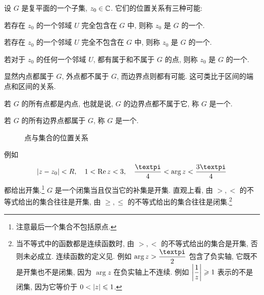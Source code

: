 设 $G$ 是复平面的一个子集, $z_0\in{\mathbb{C}}$.
它们的位置关系有三种可能:
\begin{enuma}
  \item 若存在 $z_0$ 的一个邻域 $U$ 完全包含在 $G$ 中, 则称 $z_0$ 是 $G$ 的一个.
  \item 若存在 $z_0$ 的一个邻域 $U$ 完全不包含在 $G$ 中, 则称 $z_0$ 是 $G$ 的一个.
  \item 若对于 $z_0$ 的任何一个邻域 $U$, 都有属于和不属于 $G$ 的点, 则称 $z_0$ 是 $G$ 的一个.
\end{enuma}

显然内点都属于 $G$, 外点都不属于 $G$, 而边界点则都有可能.
这可类比于区间的端点和区间的关系.

\begin{definition}
  \begin{enuma}
    \item 若 $G$ 的所有点都是内点, 也就是说, $G$ 的边界点都不属于它, 称 $G$ 是一个.
    \item 若 $G$ 的所有边界点都属于 $G$, 称 $G$ 是一个.
  \end{enuma}
\end{definition}

\begin{figure}[H]
  \centering
  \caption{点与集合的位置关系}
\end{figure}

例如
\[
  \abs{z-z_0}<R,\quad 1<\Re z<3,\quad\frac\cpi4<\arg z<\frac{3\cpi}4
\]
都给出开集.\footnote{
  注意最后一个集合不包括原点.
}
$G$ 是一个闭集当且仅当它的补集是开集.
直观上看, 由 $>,<$ 的不等式给出的集合往往是开集, 由 $\ge,\le$ 的不等式给出的集合往往是闭集.\footnote{%
  当不等式中的函数都是连续函数时, 由 $>,<$ 的不等式给出的集合是开集, 否则未必成立.
  连续函数的定义见.
  例如 $\arg z>\dfrac\cpi2$ 包含了负实轴, 它既不是开集也不是闭集, 因为 $\arg z$ 在负实轴上不连续.
  例如 $\biggl\vert\dfrac1z\biggr\vert\geqslant 1$ 表示的不是闭集, 因为它等价于 $0<\lvert z\rvert\leqslant1$.
}

